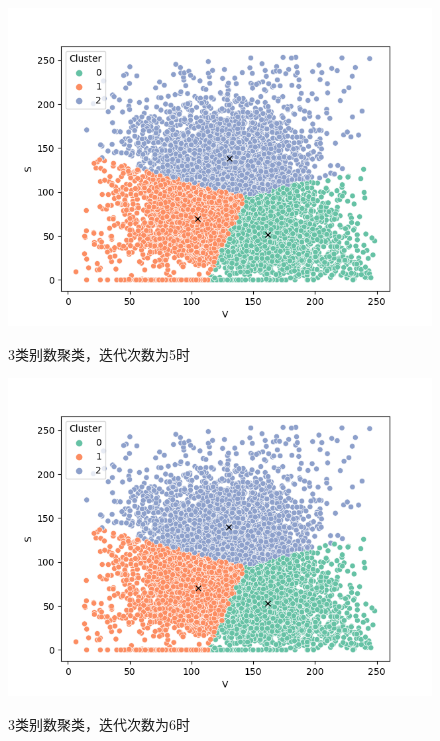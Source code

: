 \documentclass[UTF8]{ctexart}
\begin{document}
	\begin{figure}[htbp]
	\centering
	\caption{3类别数聚类，迭代次数为5时}
	\includegraphics[width=1.0\textwidth]{cluster5.png}
	\label{Fig.39}
	\end{figure}

	\begin{figure}[htbp]
	\centering
	\caption{3类别数聚类，迭代次数为6时}
	\includegraphics[width=1.0\textwidth]{cluster6.png}
	\label{Fig.40}
	\end{figure}
\end{document}

